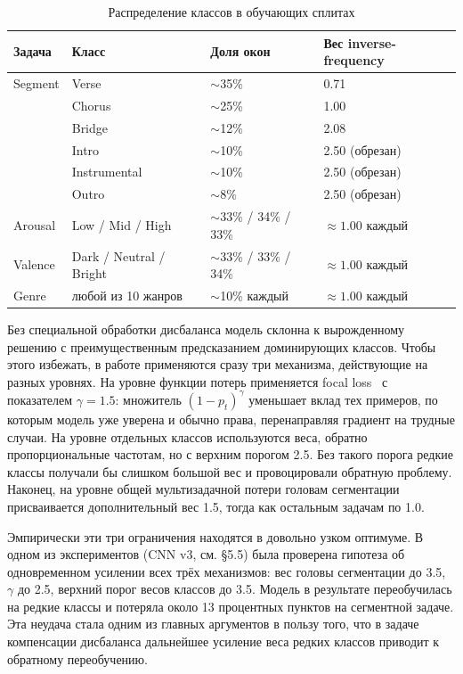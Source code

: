 \begin{table}[H]
\centering
\caption{Распределение классов в обучающих сплитах}
\label{tab:class-distribution}
\begin{tabular}{L{3cm}L{3cm}L{3cm}L{4cm}}
\toprule
Задача & Класс & Доля окон & Вес inverse-frequency \\
\midrule
Segment & Verse & $\sim$35\% & 0.71 \\
 & Chorus & $\sim$25\% & 1.00 \\
 & Bridge & $\sim$12\% & 2.08 \\
 & Intro & $\sim$10\% & 2.50 (обрезан) \\
 & Instrumental & $\sim$10\% & 2.50 (обрезан) \\
 & Outro & $\sim$8\% & 2.50 (обрезан) \\
Arousal & Low / Mid / High & $\sim$33\% / 34\% / 33\% & $\approx 1.00$ каждый \\
Valence & Dark / Neutral / Bright & $\sim$33\% / 33\% / 34\% & $\approx 1.00$ каждый \\
Genre & любой из 10 жанров & $\sim$10\% каждый & $\approx 1.00$ каждый \\
\bottomrule
\end{tabular}
\end{table}

Без специальной обработки дисбаланса модель склонна к вырожденному решению с преимущественным предсказанием доминирующих классов. Чтобы этого избежать, в работе применяются сразу три механизма, действующие на разных уровнях. На уровне функции потерь применяется focal loss~\cite{lin2017focal} с показателем $\gamma = 1.5$: множитель $(1 - p_t)^\gamma$ уменьшает вклад тех примеров, по которым модель уже уверена и обычно права, перенаправляя градиент на трудные случаи. На уровне отдельных классов используются веса, обратно пропорциональные частотам, но с верхним порогом 2.5. Без такого порога редкие классы получали бы слишком большой вес и провоцировали обратную проблему. Наконец, на уровне общей мультизадачной потери головам сегментации присваивается дополнительный вес 1.5, тогда как остальным задачам по 1.0.

Эмпирически эти три ограничения находятся в довольно узком оптимуме. В одном из экспериментов (CNN v3, см. §5.5) была проверена гипотеза об одновременном усилении всех трёх механизмов: вес головы сегментации до 3.5, $\gamma$ до 2.5, верхний порог весов классов до 3.5. Модель в результате переобучилась на редкие классы и потеряла около 13 процентных пунктов на сегментной задаче. Эта неудача стала одним из главных аргументов в пользу того, что в задаче компенсации дисбаланса дальнейшее усиление веса редких классов приводит к обратному переобучению.
